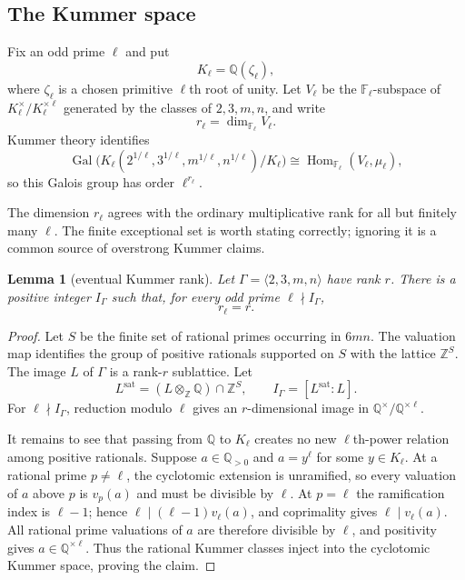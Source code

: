\documentclass[11pt,oneside]{article}
\newtheorem{lemma}[theorem]{Lemma}
\theoremstyle{definition}
\theoremstyle{remark}
\newcommand{\Q}{\mathbb{Q}}
\newcommand{\Z}{\mathbb{Z}}
\newcommand{\F}{\mathbb{F}}
\newcommand{\Gal}{\operatorname{Gal}}
\begin{document}
\subsection{The Kummer space}

Fix an odd prime $\ell$ and put
\[
 K_\ell=\Q(\zeta_\ell),
\]
where $\zeta_\ell$ is a chosen primitive $\ell$th root of unity.  Let
$V_\ell$ be the $\F_\ell$-subspace of
$K_\ell^\times/K_\ell^{\times\ell}$ generated by the classes of
$2,3,m,n$, and write
\[
 r_\ell=\dim_{\F_\ell}V_\ell.
\]
Kummer theory identifies
\begin{equation}\label{eq:kummer-galois}
 \Gal\bigl(K_\ell(2^{1/\ell},3^{1/\ell},m^{1/\ell},n^{1/\ell})/K_\ell\bigr)
 \cong \operatorname{Hom}_{\F_\ell}(V_\ell,\mu_\ell),
\end{equation}
so this Galois group has order $\ell^{r_\ell}$.

The dimension $r_\ell$ agrees with the ordinary multiplicative rank for all
but finitely many $\ell$.  The finite exceptional set is worth stating
correctly; ignoring it is a common source of overstrong Kummer claims.

\begin{lemma}[eventual Kummer rank]\label{lem:eventual-rank}
Let $\Gamma=\langle2,3,m,n\rangle$ have rank $r$.  There is a positive
integer $I_\Gamma$ such that, for every odd prime $\ell\nmid I_\Gamma$,
\[
 r_\ell=r.
\]
\end{lemma}

\begin{proof}
Let $S$ be the finite set of rational primes occurring in $6mn$.  The
valuation map identifies the group of positive rationals supported on $S$
with the lattice $\Z^S$.  The image $L$ of $\Gamma$ is a rank-$r$ sublattice.
Let
\[
 L^{\mathrm{sat}}=(L\otimes_\Z\Q)\cap\Z^S,
 \qquad I_\Gamma=[L^{\mathrm{sat}}:L].
\]
For $\ell\nmid I_\Gamma$, reduction modulo $\ell$ gives an $r$-dimensional
image in $\Q^\times/\Q^{\times\ell}$.

It remains to see that passing from $\Q$ to $K_\ell$ creates no new
$\ell$th-power relation among positive rationals.  Suppose
$a\in\Q_{>0}$ and $a=y^\ell$ for some $y\in K_\ell$.  At a rational prime
$p\ne\ell$, the cyclotomic extension is unramified, so every valuation of
$a$ above $p$ is $v_p(a)$ and must be divisible by $\ell$.  At $p=\ell$ the
ramification index is $\ell-1$; hence $\ell\mid(\ell-1)v_\ell(a)$, and
coprimality gives $\ell\mid v_\ell(a)$.  All rational prime valuations of
$a$ are therefore divisible by $\ell$, and positivity gives
$a\in\Q^{\times\ell}$.  Thus the rational Kummer classes inject into the
cyclotomic Kummer space, proving the claim.
\end{proof}
\end{document}

